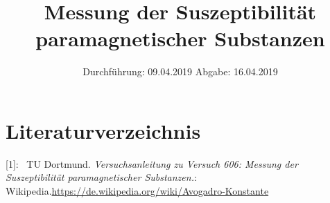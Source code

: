 

\subject{Nr. 606}
\title{Messung der Suszeptibilität paramagnetischer Substanzen}
\date{%
  Durchführung: 09.04.2019
  \hspace{3em}
  Abgabe: 16.04.2019
}



\maketitle
\thispagestyle{empty}
\tableofcontents
\newpage






\section{Literaturverzeichnis}

[1]: \ TU Dortmund. \textit{Versuchsanleitung zu Versuch 606:
Messung der Suszeptibilität paramagnetischer Substanzen.}\newline
[2]: Wikipedia.\url{https://de.wikipedia.org/wiki/Avogadro-Konstante} \newline

\printbibliography{}


